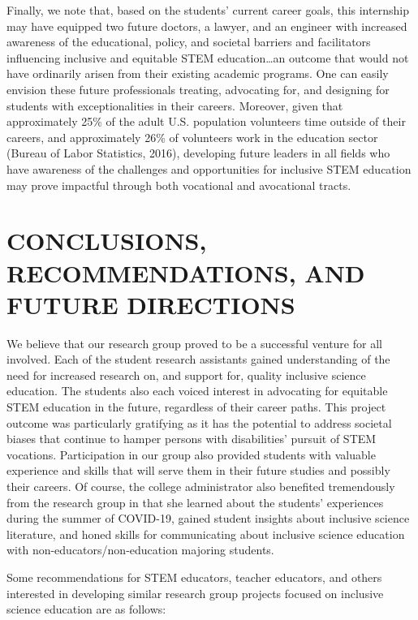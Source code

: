 \documentclass[11.5pt]{sig-alternate}
\begin{document}
\begin{large}
Finally, we note that, based on the students’ current career goals, this internship may have equipped two future doctors, a lawyer, and an engineer with increased awareness of the educational, policy, and societal barriers and facilitators influencing inclusive and equitable STEM education…an outcome that would not have ordinarily arisen from their existing academic programs. One can easily envision these future professionals treating, advocating for, and designing for students with exceptionalities in their careers.  Moreover, given that approximately 25\% of the adult U.S. population volunteers time outside of their careers, and approximately 26\% of volunteers work in the education sector (Bureau of Labor Statistics, 2016), developing future leaders in all fields who have awareness of the challenges and opportunities for inclusive STEM education may prove impactful through both vocational and avocational tracts. 

\section*{CONCLUSIONS, RECOMMENDATIONS, AND FUTURE DIRECTIONS}

We believe that our research group proved to be a successful venture for all involved. Each of the student research assistants gained understanding of the need for increased research on, and support for, quality inclusive science education. The students also each voiced interest in advocating for equitable STEM education in the future, regardless of their career paths.  This project outcome was particularly gratifying as it has the potential to address societal biases that continue to hamper persons with disabilities’ pursuit of STEM vocations.  Participation in our group also provided students with valuable experience and skills that will serve them in their future studies and possibly their careers. Of course, the college administrator also benefited tremendously from the research group in that she learned about the students’ experiences during the summer of COVID-19, gained student insights about inclusive science literature, and honed skills for communicating about inclusive science education with non-educators/non-education majoring students. 

Some recommendations for STEM educators, teacher educators, and others interested in developing similar research group projects focused on inclusive science education are as follows: 


\end{large}
\end{document}

